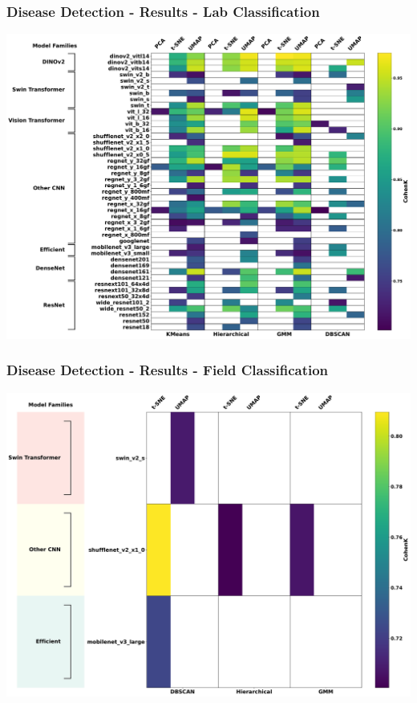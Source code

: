 \documentclass[aspectratio=43]{beamer}
\begin{document}
\begin{frame}
    \frametitle{\small Disease Detection - Results - Lab Classification}
        \centering
        \includegraphics[width=0.9\linewidth]{Imgs/Plant_Village_Dataset_Clustering_Performance.pdf}
\end{frame}

\begin{frame}
    \frametitle{\small Disease Detection - Results - Field Classification}
        \centering
        \includegraphics[width=0.9\linewidth]{Imgs/Plant_Pathology_Dataset_Clustering_Performance.pdf}
\end{frame}
\end{document}
